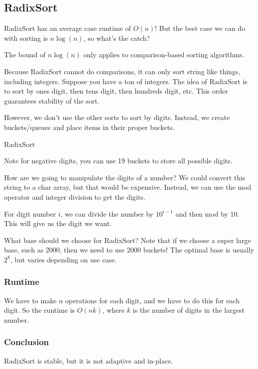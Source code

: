 
\subsection{RadixSort}

RadixSort has an average case runtime of \( O(n) \)! But the best case we can do with sorting is \( n\log (n) \), so what's the catch?

\begin{note}
	The bound of \( n\log (n) \) only applies to comparison-based sorting algorithms.
\end{note}

Because RadixSort cannot do comparisons, it can only sort string like things, including integers. Suppose you have a ton of integers. The idea of RadixSort is to sort by ones digit, then tens digit, then hundreds digit, etc. This order guarantees stability of the sort.

However, we don't use the other sorts to sort by digits. Instead, we create buckets/queues and place items in their proper buckets.

\begin{algorithm}[H]
	\caption{RadixSort}
\end{algorithm}

\begin{note}
	Note for negative digits, you can use 19 buckets to store all possible digits. 
\end{note}

How are we going to manipulate the digits of a number? We could convert this string to a char array, but that would be expensive. Instead, we can use the mod operator and integer division to get the digits.

\begin{property}
	For digit number \( i \), we can divide the number by \( 10^{i-1} \) and then mod by 10. This will give us the digit we want.
\end{property}

What base should we choose for RadixSort? Note that if we choose a super large base, such as 2000, then we need to use 2000 buckets! The optimal base is usually \( 2^8 \), but varies depending on use case.

\subsubsection{Runtime}

We have to make \( n \) operations for each digit, and we have to do this for each digit. So the runtime is \( O(nk) \), where \( k \) is the number of digits in the largest number. 

\subsubsection{Conclusion}

RadixSort is stable, but it is not adaptive and in-place.
